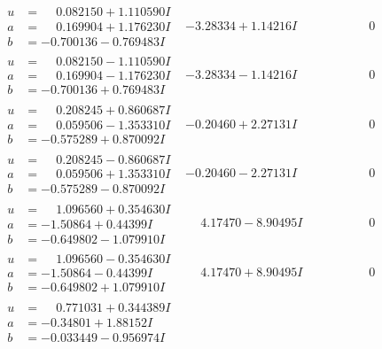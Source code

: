 \documentclass[1p]{elsarticle_modified}
\theoremstyle{definition}
\begin{document}
$$\begin{array}{c|c|c}
\begin{aligned}
u &= \phantom{-}0.082150 + 1.110590 I \\
a &= \phantom{-}0.169904 + 1.176230 I \\
b &= -0.700136 - 0.769483 I\end{aligned}
 & -3.28334 + 1.14216 I & \phantom{-0.000000 } 0 \\ \hline\begin{aligned}
u &= \phantom{-}0.082150 - 1.110590 I \\
a &= \phantom{-}0.169904 - 1.176230 I \\
b &= -0.700136 + 0.769483 I\end{aligned}
 & -3.28334 - 1.14216 I & \phantom{-0.000000 } 0 \\ \hline\begin{aligned}
u &= \phantom{-}0.208245 + 0.860687 I \\
a &= \phantom{-}0.059506 - 1.353310 I \\
b &= -0.575289 + 0.870092 I\end{aligned}
 & -0.20460 + 2.27131 I & \phantom{-0.000000 } 0 \\ \hline\begin{aligned}
u &= \phantom{-}0.208245 - 0.860687 I \\
a &= \phantom{-}0.059506 + 1.353310 I \\
b &= -0.575289 - 0.870092 I\end{aligned}
 & -0.20460 - 2.27131 I & \phantom{-0.000000 } 0 \\ \hline\begin{aligned}
u &= \phantom{-}1.096560 + 0.354630 I \\
a &= -1.50864 + 0.44399 I \\
b &= -0.649802 - 1.079910 I\end{aligned}
 & \phantom{-}4.17470 - 8.90495 I & \phantom{-0.000000 } 0 \\ \hline\begin{aligned}
u &= \phantom{-}1.096560 - 0.354630 I \\
a &= -1.50864 - 0.44399 I \\
b &= -0.649802 + 1.079910 I\end{aligned}
 & \phantom{-}4.17470 + 8.90495 I & \phantom{-0.000000 } 0 \\ \hline\begin{aligned}
u &= \phantom{-}0.771031 + 0.344389 I \\
a &= -0.34801 + 1.88152 I \\
b &= -0.033449 - 0.956974 I\end{aligned}

\end{array}$$
\end{document}
